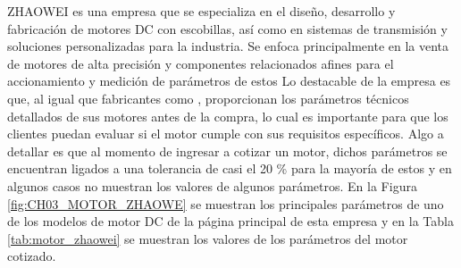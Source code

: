     \noindent
    ZHAOWEI es una empresa que se especializa en el diseño, desarrollo y fabricación de motores \ac{DC} con escobillas, así como en sistemas de transmisión y soluciones personalizadas para la industria. Se enfoca principalmente en la venta de motores de alta precisión y componentes relacionados afines para el accionamiento y medición de parámetros de estos \autocite{zhaowei_dc_motor} Lo destacable de la empresa es que, al igual que fabricantes como \textcite{zhaowei_dc_motor}, proporcionan los parámetros técnicos detallados de sus motores antes de la compra, lo cual es importante para que los clientes puedan evaluar si el motor cumple con sus requisitos específicos. Algo a detallar es que al momento de ingresar a cotizar un motor, dichos parámetros se encuentran ligados a una tolerancia de casi el 20 \% para la mayoría de estos y en algunos casos no muestran los valores de algunos parámetros. En la Figura \ref{fig:CH03_MOTOR_ZHAOWE} se muestran los principales parámetros de uno de los modelos de motor \ac{DC} de la página principal de esta empresa y en la Tabla \ref{tab:motor_zhaowei} se muestran los valores de los parámetros del motor cotizado.

